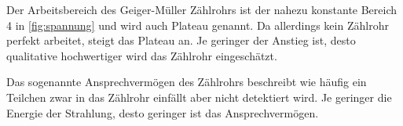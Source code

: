 Der Arbeitsbereich des Geiger-Müller Zählrohrs ist der nahezu konstante Bereich 4 in \autoref{fig:spannung} und wird auch Plateau genannt. 
Da allerdings kein Zählrohr perfekt arbeitet, steigt das Plateau an. Je geringer der Anstieg ist, desto qualitative hochwertiger wird das Zählrohr eingeschätzt.

Das sogenannte Ansprechvermögen des Zählrohrs beschreibt wie häufig ein Teilchen zwar in das Zählrohr einfällt aber nicht detektiert wird.
Je geringer die Energie der Strahlung, desto geringer ist das Ansprechvermögen.
